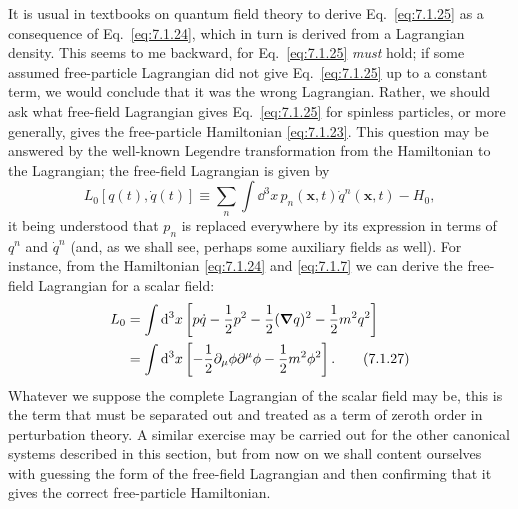 It is usual in textbooks on quantum field theory to derive Eq.~\eqref{eq:7.1.25} as
a consequence of Eq.~\eqref{eq:7.1.24}, which in turn is derived from a Lagrangian
density. This seems to me backward, for Eq.~\eqref{eq:7.1.25} \textit{must} hold; if
some assumed free-particle Lagrangian did not give Eq.~\eqref{eq:7.1.25} up to
a constant term, we would conclude that it was the wrong Lagrangian.
Rather, we should ask what free-field Lagrangian gives Eq.~\eqref{eq:7.1.25} for
spinless particles, or more generally, gives the free-particle Hamiltonian
\eqref{eq:7.1.23}. This question may be answered by the well-known Legendre
transformation from the Hamiltonian to the Lagrangian; the free-field
Lagrangian is given by
\begin{equation}
L_0[q(t),\dot q(t)]\equiv
\sum_n\int \dd^3x\,p_n(\mathbf{x},t)\dot q^n(\mathbf{x},t)-H_0,
\tag{7.1.26}\label{eq:7.1.26}
\end{equation}
it being understood that $p_n$ is replaced everywhere by its expression in
terms of $q^n$ and $\dot q^n$ (and, as we shall see, perhaps some auxiliary fields
as well). For instance, from the Hamiltonian \eqref{eq:7.1.24} and \eqref{eq:7.1.7} we can
derive the free-field Lagrangian for a scalar field:
\begin{align}
L_0&=\int \mathop{}\!\mathrm{d}^3x\left[p\dot q-\frac12p^2-\frac12(\boldsymbol{\nabla}q)^2
-\frac12m^2q^2\right]
\notag\\
&=\int \mathop{}\!\mathrm{d}^3x\left[-\frac12\partial_\mu\phi\partial^\mu\phi
-\frac12m^2\phi^2\right].
\tag{7.1.27}\label{eq:7.1.27}
\end{align}
Whatever we suppose the complete Lagrangian of the scalar field may be,
this is the term that must be separated out and treated as a term of zeroth
order in perturbation theory. A similar exercise may be carried out for
the other canonical systems described in this section, but from now on we
shall content ourselves with guessing the form of the free-field Lagrangian
and then confirming that it gives the correct free-particle Hamiltonian.

